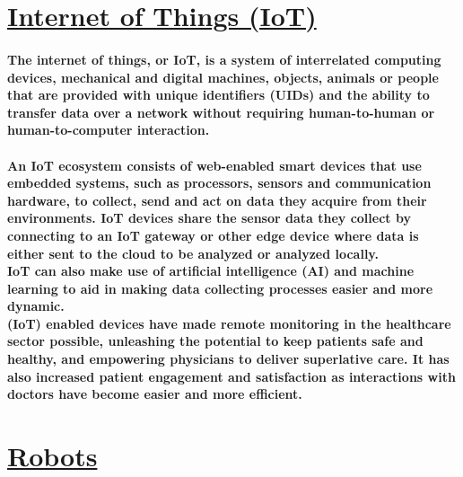 \documentclass[12pt]{article}
\begin{document}
    \section{\underline{Internet of Things (IoT)}}
    \paragraph{The internet of things, or IoT, is a system of interrelated computing devices, mechanical and digital machines, objects, animals or people that are provided with unique identifiers (UIDs) and the ability to transfer data over a network without requiring human-to-human or human-to-computer interaction.
    \\\\An IoT ecosystem consists of web-enabled smart devices that use embedded systems, such as processors, sensors and communication hardware, to collect, send and act on data they acquire from their environments. IoT devices share the sensor data they collect by connecting to an IoT gateway or other edge device where data is either sent to the cloud to be analyzed or analyzed locally.
    \\IoT can also make use of artificial intelligence (AI) and machine learning to aid in making data collecting processes easier and more dynamic. 
    \\(IoT) enabled devices have made remote monitoring in the healthcare sector possible, unleashing the potential to keep patients safe and healthy, and empowering physicians to deliver superlative care. It has also increased patient engagement and satisfaction as interactions with doctors have become easier and more efficient. }
    \section{\underline{Robots}}
\end{document}

